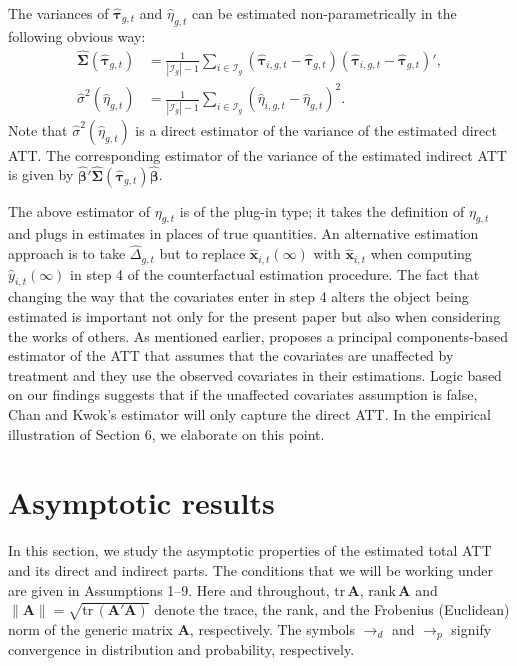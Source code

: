 \documentclass[12pt,fleqn]{article}
\def\*#1{\mathbf{#1}}
\def\+#1{\boldsymbol{#1}}
\begin{document}
The variances of $\widehat{\+\tau}_{g,t}$ and $\widehat{\eta}_{g,t}$ can be estimated non-parametrically in the following obvious way:
\begin{align}
\widehat{\+\Sigma}(\widehat{\+\tau}_{g,t}) & = \frac{1}{|\mathcal{I}_g| - 1} \sum_{i \in \mathcal{I}_g} ( \widehat{\+\tau}_{i,g,t} - \widehat{\+\tau}_{g,t} ) ( \widehat{\+\tau}_{i,g,t} - \widehat{\+\tau}_{g,t} )' ,\\
\widehat{\sigma}^2(\widehat{\eta}_{g,t}) & = \frac{1}{|\mathcal{I}_g| - 1} \sum_{i \in \mathcal{I}_g} ( \widehat{\eta}_{i,g,t} - \widehat{\eta}_{g,t} )^2.
\end{align}
Note that $\widehat{\sigma}^2(\widehat{\eta}_{g,t})$ is a direct estimator of the variance of the estimated direct ATT. The corresponding estimator of the variance of the estimated indirect ATT is given by $\widehat{\+\beta}' \widehat{\+\Sigma}(\widehat{\+\tau}_{g,t}) \widehat{\+\beta}$.

The above estimator of $\eta_{g,t}$ is of the plug-in type; it takes the definition of $\eta_{g,t}$ and plugs in estimates in places of true quantities. An alternative estimation approach is to take $\widehat \Delta_{g,t}$ but to replace $\widehat{\*x}_{i,t}(\infty)$ with $\widehat{\*x}_{i,t}$ when computing $\widehat y_{i,t}(\infty)$ in step 4 of the counterfactual estimation procedure. The fact that changing the way that the covariates enter in step 4 alters the object being estimated is important not only for the present paper but also when considering the works of others. As mentioned earlier, \citet{chan2022pcdid} proposes a principal components-based estimator of the ATT that assumes that the covariates are unaffected by treatment and they use the observed covariates in their estimations. Logic based on our findings suggests that if the unaffected covariates assumption is false, Chan and Kwok's estimator will only capture the direct ATT. In the empirical illustration of Section 6, we elaborate on this point. 

\section{Asymptotic results}

In this section, we study the asymptotic properties of the estimated total ATT and its direct and indirect parts. The conditions that we will be working under are given in Assumptions 1--9. Here and throughout, $\mathrm{tr}\, \*A$, $\mathrm{rank}\, \*A$ and $\|\*A\| = \sqrt{\mathrm{tr}\,(\*A'\*A)}$ denote the trace, the rank, and the Frobenius (Euclidean) norm of the generic matrix $\*A$, respectively. The symbols $\to_d$ and $\to_p$ signify convergence in distribution and probability, respectively.
\end{document}
